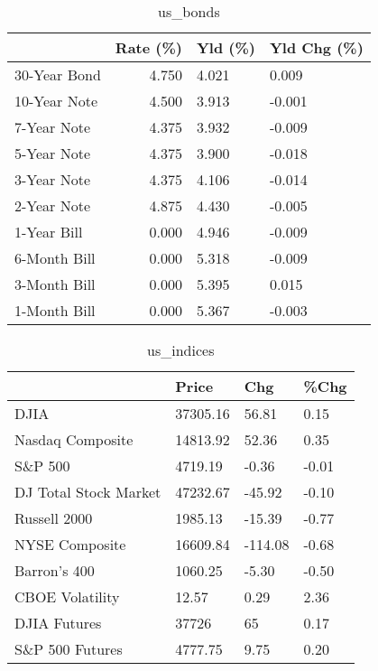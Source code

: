 \documentclass{article}%
\begin{document}
%


\begin{table}[htbp]%
\caption{us\_bonds}%
\centering%
\begin{adjustbox}{width=1\textwidth}%
\begin{tabular}{lrll}
\toprule
             &  Rate (\%) & Yld (\%) & Yld Chg (\%) \\
\midrule
30-Year Bond &     4.750 &   4.021 &       0.009 \\
10-Year Note &     4.500 &   3.913 &      -0.001 \\
 7-Year Note &     4.375 &   3.932 &      -0.009 \\
 5-Year Note &     4.375 &   3.900 &      -0.018 \\
 3-Year Note &     4.375 &   4.106 &      -0.014 \\
 2-Year Note &     4.875 &   4.430 &      -0.005 \\
 1-Year Bill &     0.000 &   4.946 &      -0.009 \\
6-Month Bill &     0.000 &   5.318 &      -0.009 \\
3-Month Bill &     0.000 &   5.395 &       0.015 \\
1-Month Bill &     0.000 &   5.367 &      -0.003 \\
\bottomrule
\end{tabular}
%
\end{adjustbox}%
\end{table}

%


\begin{table}[htbp]%
\caption{us\_indices}%
\centering%
\begin{adjustbox}{width=1\textwidth}%
\begin{tabular}{llll}
\toprule
                      &    Price &     Chg &  \%Chg \\
\midrule
                 DJIA & 37305.16 &   56.81 &  0.15 \\
     Nasdaq Composite & 14813.92 &   52.36 &  0.35 \\
              S\&P 500 &  4719.19 &   -0.36 & -0.01 \\
DJ Total Stock Market & 47232.67 &  -45.92 & -0.10 \\
         Russell 2000 &  1985.13 &  -15.39 & -0.77 \\
       NYSE Composite & 16609.84 & -114.08 & -0.68 \\
         Barron's 400 &  1060.25 &   -5.30 & -0.50 \\
      CBOE Volatility &    12.57 &    0.29 &  2.36 \\
         DJIA Futures &    37726 &      65 &  0.17 \\
      S\&P 500 Futures &  4777.75 &    9.75 &  0.20 \\
\bottomrule
\end{tabular}
%
\end{adjustbox}%
\end{table}
\end{document}
